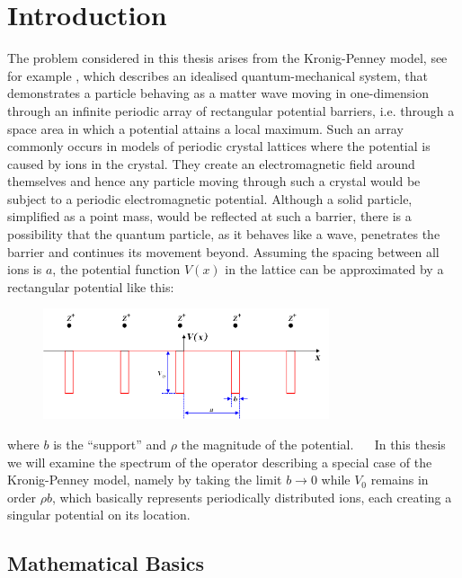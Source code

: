 \chapter{Introduction} \label{chap1}

The problem considered in this thesis arises from the Kronig-Penney model, see for example \cite[Chap. 3]{HeeringEP}, which describes an idealised quantum-mechanical system, that demonstrates a particle behaving as a matter wave moving in one-dimension through an infinite periodic array of rectangular potential barriers, i.e. through a space area in which a potential attains a local maximum. Such an array commonly occurs in models of periodic crystal lattices where the potential is caused by ions in the crystal. They create an electromagnetic field around themselves and hence any particle moving through such a crystal would be subject to a periodic electromagnetic potential. Although a solid particle, simplified as a point mass, would be reflected at such a barrier, there is a possibility that the quantum particle, as it behaves like a wave, penetrates the barrier and continues its movement beyond. Assuming the spacing between all ions is $a$, the potential function $V(x)$ in the lattice can be approximated by a rectangular potential like this:

\begin{figure}[h!] \centering
	  \includegraphics[width=0.75\textwidth]{Periodic_square_potential_130707} 
\end{figure}

where $b$ is the \enquote{support} and $\rho$ the magnitude of the potential.
~\newline ~\newline
In this thesis we will examine the spectrum of the operator describing a special case of the Kronig-Penney model, namely by taking the limit $b \rightarrow 0$ while $V_{0}$ remains in order $\rho b$, which basically represents periodically distributed ions, each creating a singular potential on its location. 

\section*{Mathematical Basics}

